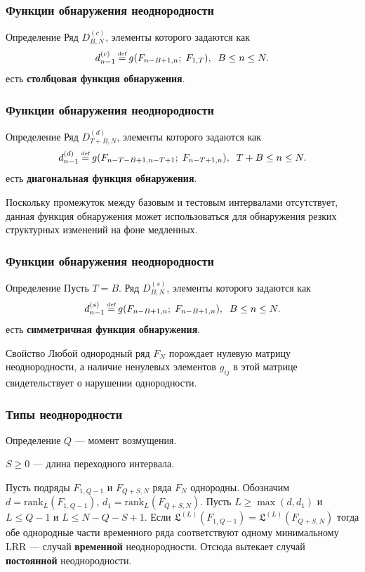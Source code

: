 \documentclass[11pt]{beamer}
\newcommand\eqdef{\mathrel{\stackrel{\makebox[0pt]{\mbox{\normalfont\tiny def}}}{=}}}
\begin{document}
	\begin{frame}
		\frametitle{Функции обнаружения неоднородности}
		\begin{block}{Определение}
			Ряд $ D_{B,N}^{(c)} $, элементы которого задаются как 
			$$ d_{n-1}^{(c)} \eqdef g(F_{n-B+1, n};\; F_{1, T}), \;\; B \leq n \leq N. $$
			есть \textbf{столбцовая функция обнаружения}.
		\end{block}
	\end{frame}
	
	\begin{frame}
		\frametitle{Функции обнаружения неоднородности}
		\begin{block}{Определение}
			Ряд $ D_{T+B,N}^{(d)} $, элементы которого задаются как 
			$$ d_{n-1}^{(d)} \eqdef g(F_{n-T-B+1, n-T+1};\; F_{n-T+1, n}), \;\; T + B \leq n \leq N. $$
			есть \textbf{диагональная функция обнаружения}.
		\end{block}
		Поскольку промежуток между базовым и тестовым интервалами отсутствует, данная функция обнаружения может использоваться для обнаружения резких структурных изменений на фоне медленных.
	\end{frame}

	\begin{frame}
		\frametitle{Функции обнаружения неоднородности}
		\begin{block}{Определение}
			Пусть $ T = B $.
			Ряд $ D_{B,N}^{(s)} $, элементы которого задаются как 
			$$ d_{n-1}^{(s)} \eqdef g(F_{n-B+1, n};\; F_{n-B+1, n}), \;\; B \leq n \leq N. $$
			есть \textbf{симметричная функция обнаружения}.
		\end{block}
	\end{frame}

	\begin{frame}
		\begin{block}{Свойство}
			Любой однородный ряд $ F_N $ порождает нулевую матрицу неоднородности, а наличие ненулевых элементов $ g_{ij} $ в этой матрице свидетельствует о нарушении однородности.
		\end{block}
	\end{frame}

	\begin{frame}
		\frametitle{Типы неоднородности}
		\begin{block}{Определение}
			$ Q $ --- момент возмущения.
			
			$ S \geq 0 $ --- длина переходного интервала.
		\end{block}
		Пусть подряды $ F_{1, Q-1} $ и $ F_{Q+S, N} $ ряда $ F_N $ однородны. Обозначим $ d = \mathrm{rank}_L(F_{1, Q-1}) $, $ d_1 = \mathrm{rank}_L(F_{Q+S, N}) $. Пусть $ L \geq \max(d, d_1) $ и $ L \leq Q-1 $ и $ L \leq N-Q-S+1 $. Если $ \mathfrak{L}^{(L)}(F_{1, Q-1}) = \mathfrak{L}^{(L)}(F_{Q+S, N})$ тогда обе однородные части временного ряда соответствуют одному минимальному $ \mathrm{LRR} $ --- случай \textbf{временной} неоднородности. Отсюда вытекает случай \textbf{постоянной} неоднородности.
	\end{frame}
\end{document}
